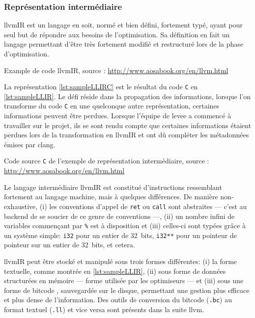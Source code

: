 \subsubsection{Représentation intermédiaire}

\gls{llvmIR} est un langage en soit, normé et bien défini, fortement typé, ayant pour seul but de répondre aux besoins de l'optimisation. Sa définition en fait un langage permettant d'être très fortement modifié et restructuré lors de la phase d'optimisation.

\begin{listing}
	\caption{Example de code \gls{llvmIR}, source : \url{http://www.aosabook.org/en/llvm.html}}
	\label{lst:sampleLLIR}
\end{listing}

La représentation \autoref{lst:sampleLLIRC} est le résultat du code \texttt{C} en \autoref{lst:sampleLLIR}. Le défi réside dans la propagation des informations, lorsque l'on transforme du code \texttt{C} en une quelconque autre représentation, certaines informations peuvent être perdues. Lorsque l'équipe de \gls{levee} a commencé à travailler sur le projet, ils se sont rendu compte que certaines informations étaient perdues lors de la transformation en \gls{llvmIR} et ont dû compléter les métadonnées émises par \gls{clang}.

\begin{listing}
	\caption{Code source \texttt{C} de l'exemple de représentation intermédiaire, source : \url{http://www.aosabook.org/en/llvm.html}}
	\label{lst:sampleLLIRC}
\end{listing}

Le langage intermédiaire \gls{llvmIR} est constitué d'instructions ressemblant fortement au langage machine, mais à quelques différences. De manière non-exhaustive, (i) les conventions d'appel de \texttt{ret} ou \texttt{call} sont abstraites --- c'est au \og backend \fg de se soucier de ce genre de conventions ---, (ii) un nombre infini de variables commençant par \texttt{\%} est à disposition et (iii) celles-ci sont typées grâce à un système simple: \texttt{i32} pour un entier de 32~bits, \texttt{i32**} pour un pointeur de pointeur sur un entier de 32~bits, et cetera.

\gls{llvmIR} peut être stocké et manipulé sous trois formes différentes: (i) la forme textuelle, comme montrée en \autoref{lst:sampleLLIR}, (ii) sous forme de données structurées en mémoire --- forme utilisée par les optimiseurs --- et (iii) sous une forme de \og bitcode \fg, sauvegardée sur le disque, permettant une gestion plus efficace et plus dense de l'information. Des outils de conversion du \og bitcode \fg (\texttt{.bc}) au format textuel (\texttt{.ll}) et vice versa sont présents dans la suite \gls{llvm}.

